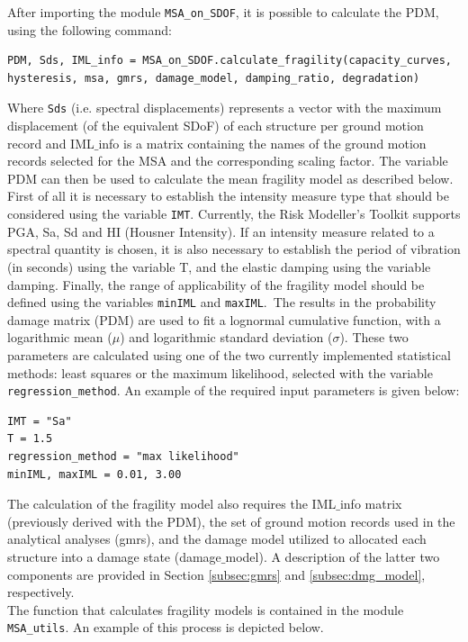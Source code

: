 After importing the module \verb=MSA_on_SDOF=, it is possible to calculate the PDM, using the following command:

\begin{Verbatim}[frame=single, commandchars=\\\{\}, samepage=true]
PDM, Sds, IML_info = MSA_on_SDOF.calculate_fragility(capacity_curves,
hysteresis, msa, gmrs, damage_model, damping_ratio, degradation)
\end{Verbatim}

Where \verb=Sds= (i.e. spectral displacements) represents a vector with the maximum displacement (of the equivalent SDoF) of each structure per ground motion record and IML$\_$info is a matrix containing the names of the ground motion records selected for the MSA and the corresponding scaling factor. The variable PDM can then be used to calculate the mean fragility model as described below.\\

First of all it is necessary to establish the intensity measure type that should be considered using the variable \verb=IMT=. Currently, the Risk Modeller’s Toolkit supports PGA, Sa, Sd and HI (Housner Intensity). If an intensity measure related to a spectral quantity is chosen, it is also necessary to establish the period of vibration (in seconds) using the variable T, and the elastic damping using the variable damping. Finally, the range of applicability of the fragility model should be defined using the variables \verb=minIML= and \verb=maxIML=.\
The results in the probability damage matrix (PDM) are used to fit a lognormal cumulative function, with a logarithmic mean ($\mu$) and logarithmic standard deviation ($\sigma$). These two parameters are calculated using one of the two currently implemented statistical methods: least squares or the maximum likelihood, selected with the variable \verb=regression_method=. An example of the required input parameters is given below:

\begin{Verbatim}[frame=single, commandchars=\\\{\}, samepage=true]
IMT = "Sa"
T = 1.5
regression_method = "max likelihood"
minIML, maxIML = 0.01, 3.00
\end{Verbatim}

The calculation of the fragility model also requires the IML$\_$info matrix (previously derived with the PDM), the set of ground motion records used in the analytical analyses (gmrs), and the damage model utilized to allocated each structure into a damage state (damage$\_$model). A description of the latter two components are provided in Section \ref{subsec:gmrs} and \ref{subsec:dmg_model}, respectively.\\
The function that calculates fragility models is contained in the module \verb=MSA_utils=. An example of this process is depicted below.

